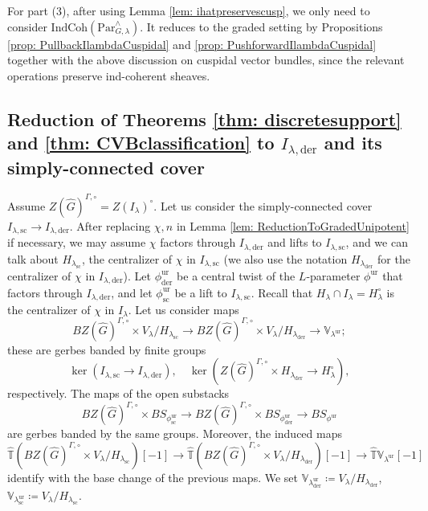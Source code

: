 \documentclass{amsart}
\theoremstyle{definition}
\theoremstyle{remark}
\numberwithin{equation}{section}
\newcommand{\der}{\mathrm{der}}
\newcommand{\Sc}{\mathrm{sc}}
\newcommand{\wh}{\widehat}
\newcommand{\Par}{\mathrm{Par}}
\newcommand{\IndCoh}{\mathrm{IndCoh}}
\newcommand{\ur}{\mathrm{ur}}
\newcommand{\V}{\mathbb{V}}
\newcommand{\T}{\mathbb{T}}
\begin{document}
For part (3), after using Lemma \ref{lem: ihatpreservescusp}, we only need to consider $\IndCoh(\Par_{G,\lambda}^\wedge)$. It reduces to the graded setting by Propositions \ref{prop: PullbackIlambdaCuspidal} and \ref{prop: PushforwardIlambdaCuspidal} together with the above discussion on cuspidal vector bundles, since the relevant operations preserve ind-coherent sheaves.  

\subsection{Reduction of Theorems \ref{thm: discretesupport} and \ref{thm: CVBclassification} to $I_{\lambda, \der}$ and its simply-connected cover}{\label{ss: reductiontosimplyconnecteddiscsuppandCVBclass}}

Assume $Z(\wh{G})^{\Gamma, \circ} = Z(I_{\lambda})^{\circ}$. Let us consider the simply-connected cover $I_{\lambda, \Sc}\to I_{\lambda, \der}$. After replacing $\chi, n$ in Lemma \ref{lem: ReductionToGradedUnipotent} if necessary, we may assume $\chi$ factors through $I_{\lambda, \der}$ and lifts to $I_{\lambda, \Sc}$, and we can talk about $H_{\lambda_\Sc}$, the centralizer of $\chi$ in $I_{\lambda, \Sc}$ (we also use the notation $H_{\lambda_{\der}}$ for the centralizer of $\chi$ in $I_{\lambda, \der}$). Let $\phi^{\ur}_{\der}$ be a central twist of the $L$-parameter $\phi^{\ur}$ that factors through $I_{\lambda,\der}$, and let $\phi^{\ur}_{\Sc}$ be a lift to $I_{\lambda, \Sc}$. Recall that $H_\lambda \cap I_{\lambda}=H_\lambda^\circ$ is the centralizer of $\chi$ in $I_\lambda$.
Let us consider maps
\[
BZ(\wh G)^{\Gamma,\circ}\times V_{\lambda} / H_{\lambda_\Sc}\to BZ(\wh G)^{\Gamma,\circ}\times V_{\lambda} / H_{\lambda_\der}  \to \V_{\lambda^\ur}; 
\]
these are gerbes banded by finite groups
\[
\ker(I_{\lambda, \Sc}\to I_{\lambda,\der}), \quad \ker(Z(\wh G)^{\Gamma,\circ}\times H_{\lambda_\der} \to H_\lambda^\circ),
\]
respectively. The maps of the open substacks
\[
BZ(\wh G)^{\Gamma,\circ}\times BS_{\phi^\ur_\Sc}\to BZ(\wh G)^{\Gamma,\circ}\times BS_{\phi^\ur_\der} \to BS_{\phi^\ur}
\]
are gerbes banded by the same groups. 
Moreover, the induced maps
\[
\wh{\T}(BZ(\wh G)^{\Gamma,\circ}\times V_{\lambda} / H_{\lambda_\Sc})[-1]\to \wh{\T}(BZ(\wh G)^{\Gamma,\circ}\times  V_{\lambda} / H_{\lambda_\der}) [-1] \to \wh{\T}\V_{\lambda^\ur}[-1]
\]
identify with the base change of the previous maps. We set $\V_{\lambda_{\der}^\ur}\coloneq V_\lambda /H_{\lambda_{\der}}$, $\V_{\lambda_{\Sc}^\ur}\coloneq V_\lambda /H_{\lambda_{\Sc}}$. 
\end{document}
